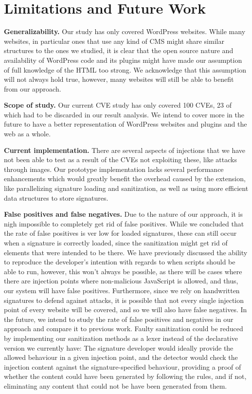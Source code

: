 \section{Limitations and Future Work}
\textbf{Generalizability.} Our study has only covered WordPress websites. While many websites, in particular ones that use any kind of CMS might share similar structures to the ones we studied, it is clear that the open source nature and availability of WordPress code and its plugins might have made our assumption of full knowledge of the HTML too strong. We acknowledge that this assumption will not always hold true, however, many websites will still be able to benefit from our approach.

\textbf{Scope of study.} Our current CVE study has only covered 100 CVEs, 23 of which had to be discarded in our result analysis. We intend to cover more in the future to have a better representation of WordPress websites and plugins and the web as a whole. 

\textbf{Current implementation.} There are several aspects of injections that we have not been able to test as a result of the CVEs not exploiting these, like attacks through images. Our prototype implementation lacks several performance enhancements which would greatly benefit the overhead caused by the extension, like parallelizing signature loading and sanitization, as well as using more efficient data structures to store signatures. 

\textbf{False positives and false negatives.} Due to the nature of our approach, it is nigh impossible to completely get rid of false positives. While we concluded that the rate of false positives is ver low for loaded signatures, these can still occur when a signature is correctly loaded, since the sanitization might get rid of elements that were intended to be there. We have previously discussed the ability to reproduce the developer's intention with regards to when scripts should be able to run, however, this won't always be possible, as there will be cases where there are injection points where non-malicious JavaScript is allowed, and thus, our system will have false positives. Furthermore, since we rely on handwritten signatures to defend against attacks, it is possible that not every single injection point of every website will be covered, and so we will also have false negatives. In the future, we intend to study the rate of false positives and negatives in our approach and compare it to previous work. Faulty sanitization could be reduced by implementing our sanitization methods as a lexer instead of the declarative version we currently have: The signature developer would ideally provide the allowed behaviour in a given injection point, and the detector would check the injection content against the signature-specified behaviour, providing a proof of whether the content could have been generated by following the rules, and if not, eliminating any content that could not be have been generated from them.

